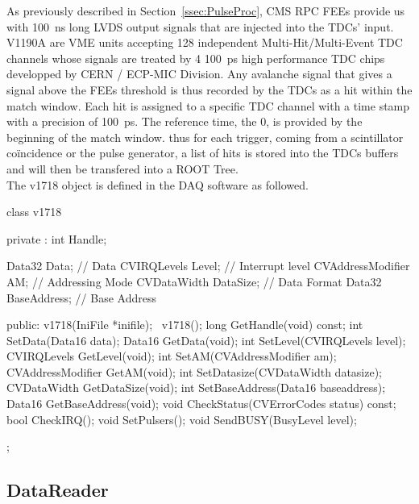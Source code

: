 	As previously described in Section~\ref{ssec:PulseProc}, CMS RPC FEEs provide us with \SI{100}{ns} long LVDS output signals that are injected into the TDCs' input. V1190A are VME units accepting 128 independent Multi-Hit/Multi-Event TDC channels whose signals are treated by 4 \SI{100}{ps} high performance TDC chips developped by CERN / ECP-MIC Division. Any avalanche signal that gives a signal above the FEEs threshold is thus recorded by the TDCs as a hit within the match window. Each hit is assigned to a specific TDC channel with a time stamp with a precision of \SI{100}{ps}. The reference time, the 0, is provided by the beginning of the match window. thus for each trigger, coming from a scintillator coïncidence or the pulse generator, a list of hits is stored into the TDCs buffers and will then be transfered into a ROOT Tree.\\
	
	The v1718 object is defined in the DAQ software as followed.
	
	\begin{cppcode}
class v1718{

    private :
        int               Handle;

        Data32            Data;           // Data
        CVIRQLevels       Level;          // Interrupt level
        CVAddressModifier AM;             // Addressing Mode
        CVDataWidth 	  DataSize;       // Data Format
        Data32            BaseAddress;    // Base Address

    public:
        v1718(IniFile *inifile);
        ~v1718();
        long              GetHandle(void) const;
        int               SetData(Data16 data);
        Data16            GetData(void);
        int               SetLevel(CVIRQLevels level);
        CVIRQLevels       GetLevel(void);
        int               SetAM(CVAddressModifier am);
        CVAddressModifier GetAM(void);
        int               SetDatasize(CVDataWidth datasize);
        CVDataWidth       GetDataSize(void);
        int               SetBaseAddress(Data16 baseaddress);
        Data16            GetBaseAddress(void);
        void              CheckStatus(CVErrorCodes status) const;
        bool              CheckIRQ();
        void              SetPulsers();
        void              SendBUSY(BusyLevel level);
};
    \end{cppcode}
	
	\subsection{DataReader}
	\label{app1:ssec:DataReader}
	
